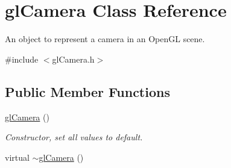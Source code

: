 \hypertarget{classgl_camera}{
\section{glCamera Class Reference}
\label{classgl_camera}
}


An object to represent a camera in an OpenGL scene.  




{\ttfamily \#include $<$glCamera.h$>$}

\subsection*{Public Member Functions}
\begin{DoxyCompactItemize}
\item 
\hyperlink{classgl_camera_a8339c3cd03f2c15ea28cc4f7d473d3cd}{glCamera} ()
\begin{DoxyCompactList}\small\item\em Constructor, set all values to default. \end{DoxyCompactList}\item 
\hypertarget{classgl_camera_a4f5818f0d43ab3d97a316d4f5834fb63}{
virtual \hyperlink{classgl_camera_a4f5818f0d43ab3d97a316d4f5834fb63}{$\sim$glCamera} ()}
\label{classgl_camera_a4f5818f0d43ab3d97a316d4f5834fb63}


\end{DoxyCompactItemize}

